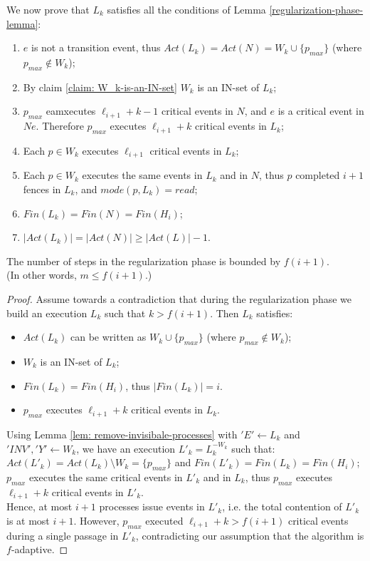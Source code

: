 We now prove that $L_k$ satisfies all the conditions of Lemma \ref{regularization-phase-lemma}:
\begin{enumerate} [(1)]
	\item $e$ is not a transition event, thus $Act(L_k) = Act(N) = W_k \cup \{p_{max}\}$ (where $p_{max} \notin W_k$);
	\item By claim \ref{claim: W_k-is-an-IN-set} $W_k$ is an IN-set of $L_k$;
	\item $p_{max}$ eamxecutes $\ell_{i+1}+k-1$ critical events in $N$, and $e$ is a critical event in $N e$. Therefore $p_{max}$ executes $\ell_{i+1}+k$ critical events in $L_k$;
	\item Each $p \in W_k$ executes $\ell_{i+1}$ critical events in $L_k$;
	\item Each $p \in W_k$ executes the same events in $L_k$ and in $N$, thus $p$ completed $i+1$ fences in $L_k$, and $mode(p,L_k) = read$;
	\item $Fin(L_k) = Fin(N) = Fin(H_i)$;
	\item $|Act(L_k)| = |Act(N)| \geq |Act(L)|-1$.
\end{enumerate}

\begin{claim-section} \label{claim: regularization-upper-bound}
	The number of steps in the regularization phase is bounded by $f(i+1)$. \\ (In other words, $m \leq f(i+1)$.)
\end{claim-section}
\begin{proof}
	Assume towards a contradiction that during the regularization phase we build an execution $L_k$ such that $k > f(i+1)$. Then $L_k$ satisfies:
	\begin{itemize}
		\item $Act(L_k)$ can be written as $W_k \cup \{p_{max}\}$ (where $p_{max} \notin W_k$);
		\item $W_k$ is an IN-set of $L_k$;
		\item $Fin(L_k) = Fin(H_i)$, thus $|Fin(L_k)| = i$.
		\item $p_{max}$ executes $\ell_{i+1}+k$ critical events in $L_k$.
	\end{itemize}
	Using Lemma \ref{lem: remove-invisibale-processes} with $'E' \leftarrow L_k$ and $'INV','Y' \leftarrow W_k$, we have an execution $L'_k = L_k^{-W_k}$ such that: $Act(L'_k) = Act(L_k) \setminus W_k = \{p_{max}\}$ and $Fin(L'_k) = Fin(L_k) = Fin(H_i)$; $p_{max}$ executes the same critical events in $L'_k$ and in $L_k$, thus $p_{max}$ executes $\ell_{i+1}+k$ critical events in $L'_k$.
	\\ Hence, at most $i+1$ processes issue events in $L'_k$, i.e. the total contention of $L'_k$ is at most $i+1$. However, $p_{max}$ executed $\ell_{i+1}+k > f(i+1)$ critical events during a single passage in $L'_k$, contradicting our assumption that the algorithm is $f$-adaptive.
\end{proof}




